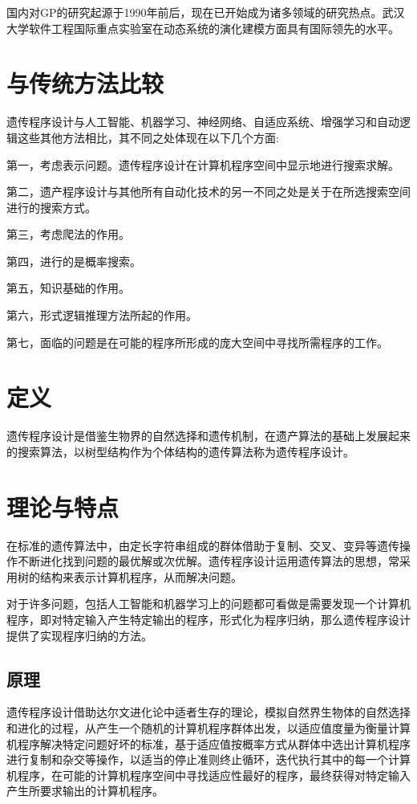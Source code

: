 \documentclass[UTF8]{ctexart}
\begin{document}
国内对GP的研究起源于1990年前后，现在已开始成为诸多领域的研究热点。武汉大学软件工程国际重点实验室在动态系统的演化建模方面具有国际领先的水平。

\section{与传统方法比较}
遗传程序设计与人工智能、机器学习、神经网络、自适应系统、增强学习和自动逻辑这些其他方法相比，其不同之处体现在以下几个方面:

第一，考虑表示问题。遗传程序设计在计算机程序空间中显示地进行搜索求解。

第二，遗产程序设计与其他所有自动化技术的另一不同之处是关于在所选搜索空间进行的搜索方式。

第三，考虑爬法的作用。

第四，进行的是概率搜索。

第五，知识基础的作用。

第六，形式逻辑推理方法所起的作用。

第七，面临的问题是在可能的程序所形成的庞大空间中寻找所需程序的工作。

\section{定义}
遗传程序设计是借鉴生物界的自然选择和遗传机制，在遗产算法的基础上发展起来的搜索算法，以树型结构作为个体结构的遗传算法称为遗传程序设计。

\section{理论与特点}
在标准的遗传算法中，由定长字符串组成的群体借助于复制、交叉、变异等遗传操作不断进化找到问题的最优解或次优解。遗传程序设计运用遗传算法的思想，常采用树的结构来表示计算机程序，从而解决问题。

对于许多问题，包括人工智能和机器学习上的问题都可看做是需要发现一个计算机程序，即对特定输入产生特定输出的程序，形式化为程序归纳，那么遗传程序设计提供了实现程序归纳的方法。

\subsection{原理}
遗传程序设计借助达尔文进化论中适者生存的理论，模拟自然界生物体的自然选择和进化的过程，从产生一个随机的计算机程序群体出发，以适应值度量为衡量计算机程序解决特定问题好坏的标准，基于适应值按概率方式从群体中选出计算机程序进行复制和杂交等操作，以适当的停止准则终止循环，迭代执行其中的每一个计算机程序，在可能的计算机程序空间中寻找适应性最好的程序，最终获得对特定输入产生所要求输出的计算机程序。
\end{document}
